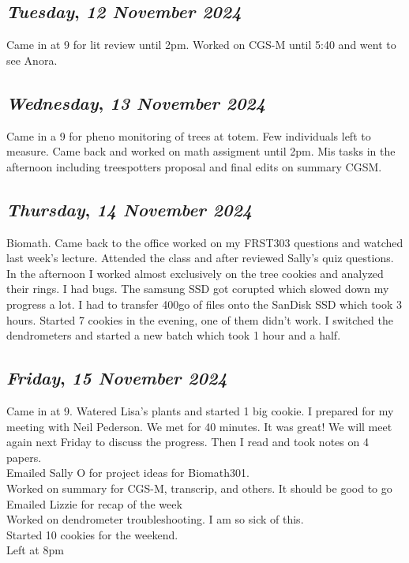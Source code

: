 \def\day{\textit{12 November 2024}}
\def\weekday{\textit{Tuesday}}
\subsection*{\weekday, \day}
Came in at 9 for lit review until 2pm. Worked on CGS-M until 5:40 and went to see Anora. 

\def\day{\textit{13 November 2024}}
\def\weekday{\textit{Wednesday}}
\subsection*{\weekday, \day}
Came in a 9 for pheno monitoring of trees at totem. Few individuals left to measure. Came back and worked on math assigment until 2pm. Mis tasks in the afternoon including treespotters proposal and final edits on summary CGSM.

\def\day{\textit{14 November 2024}}
\def\weekday{\textit{Thursday}}
\subsection*{\weekday, \day}
Biomath. Came back to the office worked on my FRST303 questions and watched last week's lecture. Attended the class and after reviewed Sally's quiz questions. In the afternoon I worked almost exclusively on the tree cookies and analyzed their rings. I had bugs. The samsung SSD got corupted which slowed down my progress a lot. I had to transfer 400go of files onto the SanDisk SSD which took 3 hours. Started 7 cookies in the evening, one of them didn't work. I switched the dendrometers and started a new batch which took 1 hour and a half. 

\def\day{\textit{15 November 2024}}
\def\weekday{\textit{Friday}}
\subsection*{\weekday, \day}
Came in at 9. Watered Lisa's plants and started 1 big cookie. I prepared for my meeting with Neil Pederson. We met for 40 minutes. It was great! We will meet again next Friday to discuss the progress. Then I read and took notes on 4 papers. \\
Emailed Sally O for project ideas for Biomath301. \\
Worked on summary for CGS-M, transcrip, and others. It should be good to go\\
Emailed Lizzie for recap of the week\\
Worked on dendrometer troubleshooting. I am so sick of this.\\
Started 10 cookies for the weekend.\\
Left at 8pm
\def\day{\textit{16 November 2024}}
\def\weekday{\textit{Saturday}}

